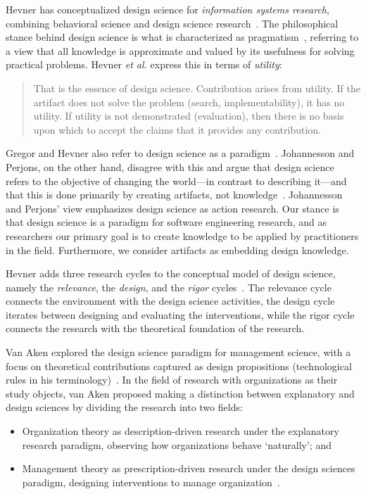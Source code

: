 \documentclass[graybox]{svmult}
\begin{document}
Hevner has conceptualized design science for \emph{information systems research}, combining behavioral science and design science research~\cite{hevner_design_2004,hevner_design_2010}.
The philosophical stance behind design science is what is characterized as pragmatism~\cite{easterbrook_selecting_2008}, referring to a view that all knowledge is approximate and valued by its usefulness for solving practical problems. Hevner \emph{et al.} express this in terms of \emph{utility}: 

\begin{quote}
	That is the essence of design science. Contribution arises from utility. If the artifact does not solve the problem (search, implementability), it has no utility. If utility is not demonstrated (evaluation), then there is no basis upon which to accept the claims that it provides any contribution.~\cite[p. 91]{hevner_design_2004}
\end{quote}


Gregor and Hevner also refer to design science as a paradigm~\cite{gregor_positioning_2013}. Johannesson and Perjons, on the other hand, disagree with this and argue that design science refers to the objective of changing the world---in contrast to describing it---and that this is done primarily by creating artifacts, not knowledge~\cite{johannesson_introduction_2014}. Johannesson and Perjons' view emphasizes design science as action research. Our stance is that design science is a paradigm for software engineering research, and as researchers our primary goal is to create knowledge to be applied by practitioners in the field. Furthermore, we consider artifacts as embedding design knowledge. 

Hevner adds three research cycles to the conceptual model of design science, namely the \emph{relevance}, the \emph{design}, and the \emph{rigor} cycles~\cite{Hevner2007}. The relevance cycle connects the environment with the design science activities, the design cycle iterates between designing and evaluating the interventions, while the rigor cycle connects the research with the theoretical foundation of the research.



Van Aken explored the design science paradigm for management science, with a focus on theoretical contributions captured as design propositions (technological rules in his terminology)~\cite{van_aken_management_2004,van_aken_management_2005}. 
In the field of research with organizations as their study objects, van Aken proposed making a distinction between explanatory and design sciences by dividing the research into two fields: 
\begin{itemize}
\item Organization theory as description-driven research under the explanatory research paradigm, observing how organizations behave `naturally'; and 
\item Management theory as prescription-driven research under the design sciences paradigm, designing interventions to manage organization~\cite{van_aken_management_2004}.  
\end{itemize}
\end{document}
